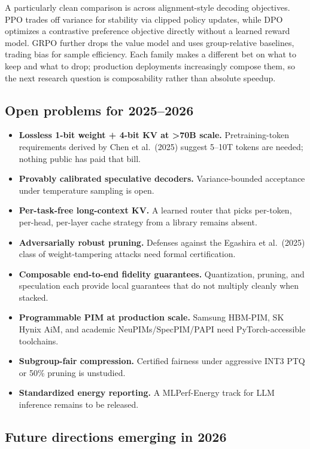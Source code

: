\documentclass{article}
\begin{document}
A particularly clean comparison is across alignment-style decoding objectives. PPO trades off variance for stability via clipped policy updates, while DPO optimizes a contrastive preference objective directly without a learned reward model. GRPO further drops the value model and uses group-relative baselines, trading bias for sample efficiency. Each family makes a different bet on what to keep and what to drop; production deployments increasingly compose them, so the next research question is composability rather than absolute speedup.

\subsection{Open problems for 2025--2026}\label{open-problems-for-20252026}

\begin{itemize}

\item
  \textbf{Lossless 1-bit weight + 4-bit KV at \textgreater70B scale.} Pretraining-token requirements derived by Chen et al.~(2025) suggest 5--10T tokens are needed; nothing public has paid that bill.
\item
  \textbf{Provably calibrated speculative decoders.} Variance-bounded acceptance under temperature sampling is open.
\item
  \textbf{Per-task-free long-context KV.} A learned router that picks per-token, per-head, per-layer cache strategy from a library remains absent.
\item
  \textbf{Adversarially robust pruning.} Defenses against the Egashira et al.~(2025) class of weight-tampering attacks need formal certification.
\item
  \textbf{Composable end-to-end fidelity guarantees.} Quantization, pruning, and speculation each provide local guarantees that do not multiply cleanly when stacked.
\item
  \textbf{Programmable PIM at production scale.} Samsung HBM-PIM, SK Hynix AiM, and academic NeuPIMs/SpecPIM/PAPI need PyTorch-accessible toolchains.
\item
  \textbf{Subgroup-fair compression.} Certified fairness under aggressive INT3 PTQ or 50\% pruning is unstudied.
\item
  \textbf{Standardized energy reporting.} A MLPerf-Energy track for LLM inference remains to be released.
\end{itemize}

\subsection{Future directions emerging in 2026}\label{future-directions-emerging-in-2026}
\end{document}
